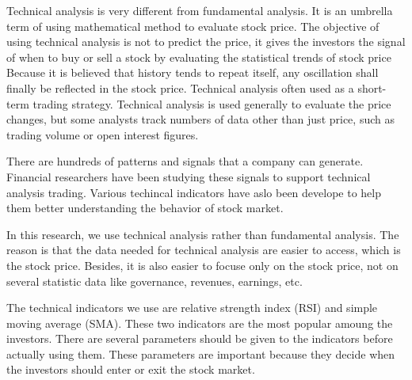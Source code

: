 \documentclass[../main.tex]{subfiles}
\begin{document}
\bigbreak

Technical analysis is very different from fundamental analysis. It is an umbrella term of using mathematical method to evaluate stock price. The objective of using technical analysis is not to predict the price, it gives the investors the signal of when to buy or sell a stock by evaluating the statistical trends of stock price Because it is believed that history tends to repeat itself, any oscillation shall finally be reflected in the stock price. Technical analysis often used as a short-term trading strategy. Technical analysis is used generally to evaluate the price changes, but some analysts track numbers of data other than just price, such as trading volume or open interest figures.

\bigbreak

There are hundreds of patterns and signals that a company can generate. Financial researchers have been studying these signals to support technical analysis trading. Various techincal indicators have aslo been develope to help them better understanding the behavior of stock market.

\bigbreak



In this research, we use technical analysis rather than fundamental analysis. The reason is that the data needed for technical analysis are easier to access, which is the stock price. Besides, it is also easier to focuse only on the stock price, not on several statistic data like governance, revenues, earnings, etc.

\bigbreak

The technical indicators we use are relative strength index (RSI) and simple moving average (SMA). These two indicators are the most popular amoung the investors. There are several parameters should be given to the indicators before actually using them. These parameters are important because they decide when the investors should enter or exit the stock market.
\end{document}
